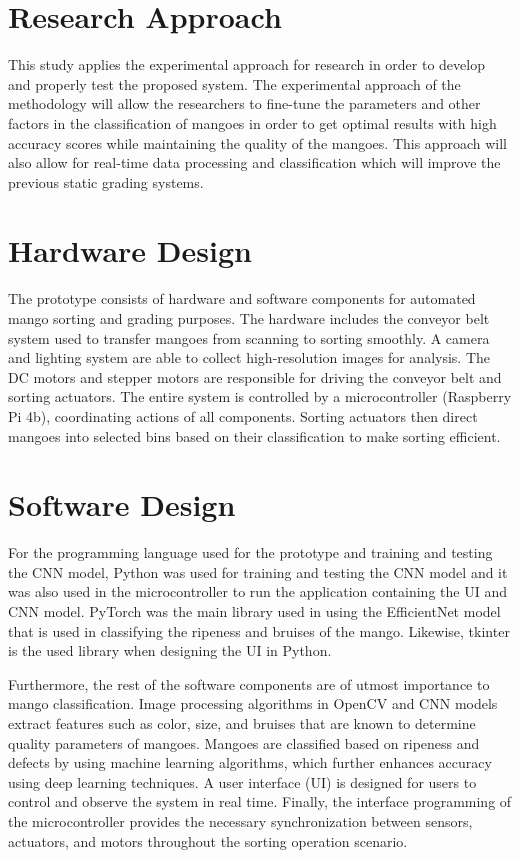 \section{Research Approach} \label{sec:researchApproach}
This study applies the experimental approach for research in order to develop and properly test the proposed system. The experimental approach of the methodology will allow the researchers to fine-tune the parameters and other factors in the classification of mangoes in order to get optimal results with high accuracy scores while maintaining the quality of the mangoes. This approach will also allow for real-time data processing and classification which will improve the previous static grading systems.

\section{Hardware Design} \label{sec:hardwareDesign}
The prototype consists of hardware and software components for automated mango sorting and grading purposes. The hardware includes the conveyor belt system used to transfer mangoes from scanning to sorting smoothly. A camera and lighting system are able to collect high-resolution images for analysis. The DC motors and stepper motors are responsible for driving the conveyor belt and sorting actuators. The entire system is controlled by a microcontroller (Raspberry Pi 4b), coordinating actions of all components. Sorting actuators then direct mangoes into selected bins based on their classification to make sorting efficient. 

\section{Software Design} 
For the programming language used for the prototype and training and testing the CNN model, Python was used for training and testing the CNN model and it was also used in the microcontroller to run the application containing the UI and CNN model. PyTorch was the main library used in using the EfficientNet model that is used in classifying the ripeness and bruises of the mango. Likewise, tkinter is the used library when designing the UI in Python.

Furthermore, the rest of the software components are of utmost importance to mango classification. Image processing algorithms in OpenCV and CNN models extract features such as color, size, and bruises that are known to determine quality parameters of mangoes. Mangoes are classified based on ripeness and defects by using machine learning algorithms, which further enhances accuracy using deep learning techniques. A user interface (UI) is designed for users to control and observe the system in real time. Finally, the interface programming of the microcontroller provides the necessary synchronization between sensors, actuators, and motors throughout the sorting operation scenario.

